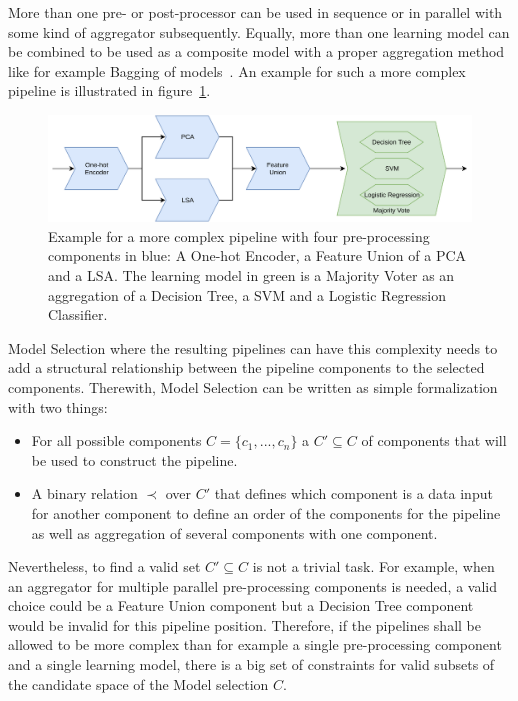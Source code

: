 More than one pre- or post-processor can be used in sequence or in parallel with some kind of aggregator subsequently.
Equally, more than one learning model can be combined to be used as a composite model with a proper aggregation method like for example Bagging of models~\cite{Breiman-BaggingPredictors}.
An example for such a more complex pipeline is illustrated in figure~\ref{fig:theory:complexPipeline}.\newline
\begin{figure}[ht!]
    \centering
    \includegraphics[width=\textwidth]{gfx/Figures/ComplexPipeline.pdf}
    \caption{Example for a more complex pipeline with four pre-processing components in blue: A One-hot Encoder, a Feature Union of a PCA and a LSA. The learning model in green is a Majority Voter as an aggregation of a Decision Tree, a SVM and a Logistic Regression Classifier. }
	\label{fig:theory:complexPipeline}
\end{figure}
Model Selection where the resulting pipelines can have this complexity needs to add a structural relationship between the pipeline components to the selected components.
Therewith, Model Selection can be written as simple formalization with two things:
\begin{itemize}
    \item For all possible components $C=\{c_1, ..., c_n\}$ a $C' \subseteq C$ of components that will be used to construct the pipeline.
    \item A binary relation $\prec$ over $C'$ that defines which component is a data input for another component to define an order of the components for the pipeline as well as aggregation of several components with one component. 
\end{itemize}
Nevertheless, to find a valid set $C' \subseteq C$ is not a trivial task.
For example, when an aggregator for multiple parallel pre-processing components is needed, a valid choice could be a Feature Union component but a Decision Tree component would be invalid for this pipeline position.
Therefore, if the pipelines shall be allowed to be more complex than for example a single pre-processing component and a single learning model, there is a big set of constraints for valid subsets of the candidate space of the Model selection $C$.

